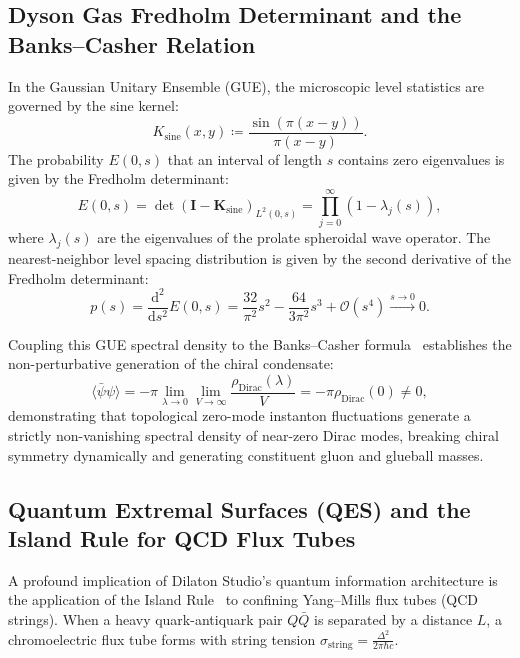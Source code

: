 \documentclass[11pt,a4paper,reqno]{article}
\theoremstyle{plain}
\theoremstyle{definition}
\theoremstyle{remark}
\numberwithin{equation}{section}
\providecommand{\diff}{\mathrm{d}}
\begin{document}
\subsection{Dyson Gas Fredholm Determinant and the Banks--Casher Relation}
\label{subsec:dyson_banks_casher}

In the Gaussian Unitary Ensemble (GUE), the microscopic level statistics are governed by the sine kernel:
\begin{equation}
  K_{\mathrm{sine}}(x, y) \coloneqq \frac{\sin\left(\pi(x - y)\right)}{\pi(x - y)}.
\end{equation}
The probability $E(0, s)$ that an interval of length $s$ contains zero eigenvalues is given by the Fredholm determinant:
\begin{equation}
  E(0, s) = \det\left( \mathbf{I} - \mathbf{K}_{\mathrm{sine}} \right)_{L^2(0, s)} = \prod_{j=0}^\infty \left( 1 - \lambda_j(s) \right),
\end{equation}
where $\lambda_j(s)$ are the eigenvalues of the prolate spheroidal wave operator. The nearest-neighbor level spacing distribution is given by the second derivative of the Fredholm determinant:
\begin{equation}
  p(s) = \frac{\diff^2}{\diff s^2} E(0, s) = \frac{32}{\pi^2} s^2 - \frac{64}{3\pi^2} s^3 + \mathcal{O}(s^4) \xrightarrow{s \to 0} 0.
\end{equation}

Coupling this GUE spectral density to the Banks--Casher formula~\cite{BanksCasher1980} establishes the non-perturbative generation of the chiral condensate:
\begin{equation}
  \langle \bar{\psi} \psi \rangle = -\pi \lim_{\lambda \to 0} \lim_{V \to \infty} \frac{\rho_{\mathrm{Dirac}}(\lambda)}{V} = -\pi \rho_{\mathrm{Dirac}}(0) \ne 0,
\end{equation}
demonstrating that topological zero-mode instanton fluctuations generate a strictly non-vanishing spectral density of near-zero Dirac modes, breaking chiral symmetry dynamically and generating constituent gluon and glueball masses.

\subsection{Quantum Extremal Surfaces (QES) and the Island Rule for QCD Flux Tubes}
\label{subsec:qes_island_flux_tubes}

A profound implication of Dilaton Studio's quantum information architecture is the application of the Island Rule~\cite{Penington2019, AlmheiriMahajanMaldacenaZhao2020} to confining Yang--Mills flux tubes (QCD strings). When a heavy quark-antiquark pair $Q\bar{Q}$ is separated by a distance $L$, a chromoelectric flux tube forms with string tension $\sigma_{\mathrm{string}} = \frac{\Delta^2}{2\pi \hbar c}$.
\end{document}
